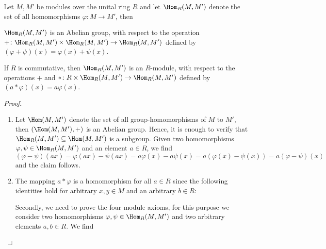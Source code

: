 \begin{prop}\label{prop.Homomorphisms are Module}
Let $M,M'$ be modules over the unital ring $R$ and let $\Hom_R(M,M')$ denote the set of all homomorphisms $\varphi\colon M\to M'$, then
\begin{exlist}
\item \label{prop.Homomorphisms are Group} $\Hom_R(M,M')$ is an Abelian group, with respect to the operation $+\colon\Hom_R(M,M')\times\Hom_R(M,M')\to\Hom_R(M,M')$ defined by $(\varphi+\psi)(x)=\varphi(x)+\psi(x)$.
\item If $R$ is commutative, then $\Hom_R(M,M')$ is an $R$-module, with respect to the operations $+$ and $\ast\colon R\times\Hom_R(M,M')\to\Hom_R(M,M')$ defined by $(a\ast\varphi)(x)=a\varphi(x)$.
\end{exlist}
\end{prop}
\begin{proof}
\begin{enumerate}
\item Let $\Hom(M,M')$ denote the set of all group-homomorphisms of $M$ to $M'$, then $(\Hom(M,M'),+)$ is an Abelian group. Hence, it is enough to verify that $\Hom_R(M,M')\subseteq\Hom(M,M')$ is a subgroup. Given two homomorphisms $\varphi,\psi\in\Hom_R(M,M')$ and an element $a\in R$, we find
\begin{equation*}
(\varphi-\psi)(ax)=\varphi(ax)-\psi(ax)=a\varphi(x)-a\psi(x)=a(\varphi(x)-\psi(x))=a(\varphi-\psi)(x)
\end{equation*}
and the claim follows.
\item The mapping $a\ast\varphi$ is a homomorphism for all $a\in R$ since the following identities hold for arbitrary $x,y\in M$ and an arbitrary $b\in R$:


Secondly, we need to prove the four module-axioms, for this purpose we consider two homomorphisms $\varphi,\psi\in\Hom_R(M,M')$ and two arbitrary elements $a,b\in R$. We find
\end{enumerate}
\end{proof}

